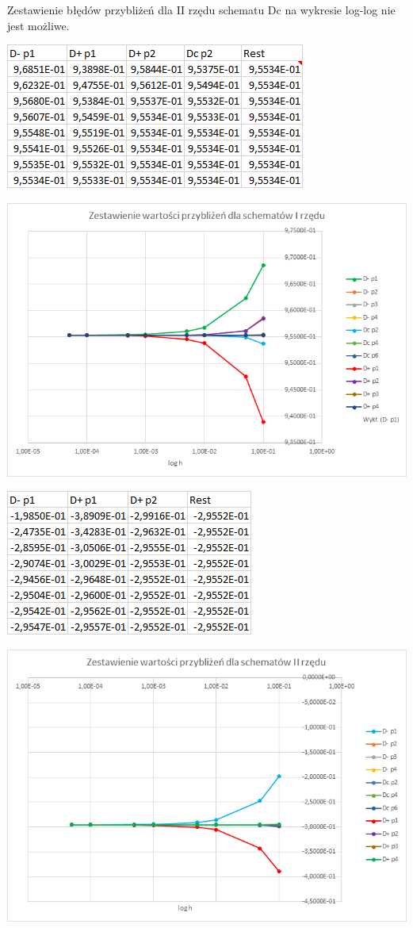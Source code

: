 Zestawienie błędów przybliżeń dla II rzędu schematu Dc na wykresie log-log nie jest możliwe. 

\includegraphics{Lab2/charts/rz1_log_e_dane.png}

\includegraphics{Lab2/charts/rz1_log_e.png}
\newpage


\includegraphics{Lab2/charts/rz2_log_e_dane.png}

\includegraphics{Lab2/charts/rz2_log_e.png}
\newpage


